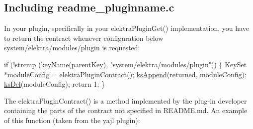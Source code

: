 \subsection*{Including {\ttfamily readme\+\_\+pluginname.\+c}}

In your plugin, specifically in your {\ttfamily elektra\+Plugin\+Get()} implementation, you have to return the contract whenever configuration below {\ttfamily system/elektra/modules/plugin} is requested\+:


\begin{DoxyCode}
\textcolor{keywordflow}{if} (!strcmp (\hyperlink{group__keyname_ga8e805c726a60da921d3736cda7813513}{keyName}(parentKey), \textcolor{stringliteral}{"system/elektra/modules/plugin"}))
\{
        KeySet *moduleConfig = elektraPluginContract();
        \hyperlink{group__keyset_ga21eb9c3a14a604ee3a8bdc779232e7b7}{ksAppend}(returned, moduleConfig);
        \hyperlink{group__keyset_ga27e5c16473b02a422238c8d970db7ac8}{ksDel}(moduleConfig);
        \textcolor{keywordflow}{return} 1;
\}
\end{DoxyCode}


The {\ttfamily elektra\+Plugin\+Contract()} is a method implemented by the plug-\/in developer containing the parts of the contract not specified in {\ttfamily R\+E\+A\+D\+M\+E.\+md}. An example of this function (taken from the {\ttfamily yajl} plugin)\+:


